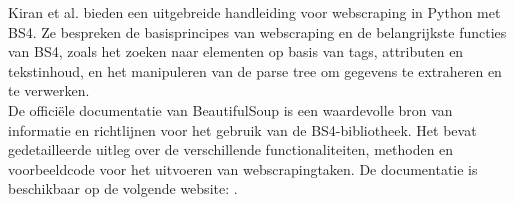 Kiran et al. \autocite{BSFOR2015} bieden een uitgebreide handleiding voor webscraping in Python met BS4. Ze bespreken de basisprincipes van webscraping en de belangrijkste functies van BS4, zoals het zoeken naar elementen op basis van tags, attributen en tekstinhoud, en het manipuleren van de parse tree om gegevens te extraheren en te verwerken. \\

De officiële documentatie van BeautifulSoup is een waardevolle bron van informatie en richtlijnen voor het gebruik van de BS4-bibliotheek. Het bevat gedetailleerde uitleg over de verschillende functionaliteiten, methoden en voorbeeldcode voor het uitvoeren van webscrapingtaken. De documentatie is beschikbaar op de volgende website: \autocite{BS4Documentation}.
